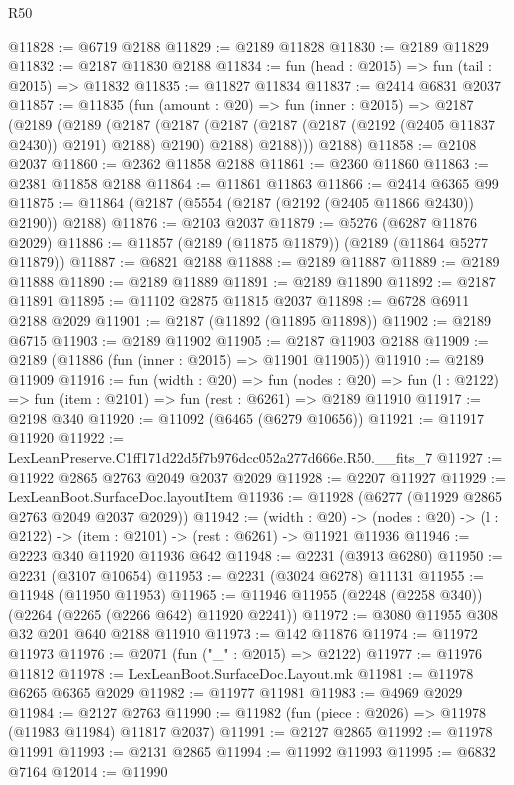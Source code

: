 \begin{lexlean}{R50}
\begin{coremodule}
@11828 := @6719 @2188
@11829 := @2189 @11828
@11830 := @2189 @11829
@11832 := @2187 @11830 @2188
@11834 := fun (head : @2015) => fun (tail : @2015) => @11832
@11835 := @11827 @11834
@11837 := @2414 @6831 @2037
@11857 := @11835
    (fun (amount : @20) =>
    fun (inner : @2015) =>
    @2187
      (@2189
        (@2189
          (@2187
            (@2187 (@2187 (@2187 (@2187 (@2192 (@2405 @11837 @2430)) @2191) @2188) @2190) @2188)
            @2188)))
      @2188)
@11858 := @2108 @2037
@11860 := @2362 @11858 @2188
@11861 := @2360 @11860
@11863 := @2381 @11858 @2188
@11864 := @11861 @11863
@11866 := @2414 @6365 @99
@11875 := @11864 (@2187 (@5554 (@2187 (@2192 (@2405 @11866 @2430)) @2190)) @2188)
@11876 := @2103 @2037
@11879 := @5276 (@6287 @11876 @2029)
@11886 := @11857 (@2189 (@11875 @11879)) (@2189 (@11864 @5277 @11879))
@11887 := @6821 @2188
@11888 := @2189 @11887
@11889 := @2189 @11888
@11890 := @2189 @11889
@11891 := @2189 @11890
@11892 := @2187 @11891
@11895 := @11102 @2875 @11815 @2037
@11898 := @6728 @6911 @2188 @2029
@11901 := @2187 (@11892 (@11895 @11898))
@11902 := @2189 @6715
@11903 := @2189 @11902
@11905 := @2187 @11903 @2188
@11909 := @2189 (@11886 (fun (inner : @2015) => @11901 @11905))
@11910 := @2189 @11909
@11916 := fun (width : @20) =>
  fun (nodes : @20) => fun (l : @2122) => fun (item : @2101) => fun (rest : @6261) => @2189 @11910
@11917 := @2198 @340
@11920 := @11092 (@6465 (@6279 @10656))
@11921 := @11917 @11920
@11922 := LexLeanPreserve.C1ff171d22d5f7b976dcc052a277d666e.R50.__fits_7
@11927 := @11922 @2865 @2763 @2049 @2037 @2029
@11928 := @2207 @11927
@11929 := LexLeanBoot.SurfaceDoc.layoutItem
@11936 := @11928 (@6277 (@11929 @2865 @2763 @2049 @2037 @2029))
@11942 := (width : @20) ->
  (nodes : @20) -> (l : @2122) -> (item : @2101) -> (rest : @6261) -> @11921 @11936
@11946 := @2223 @340 @11920 @11936 @642
@11948 := @2231 (@3913 @6280)
@11950 := @2231 (@3107 @10654)
@11953 := @2231 (@3024 @6278) @11131
@11955 := @11948 (@11950 @11953)
@11965 := @11946 @11955 (@2248 (@2258 @340)) (@2264 (@2265 (@2266 @642) @11920 @2241))
@11972 := @3080 @11955 @308 @32 @201 @640 @2188 @11910
@11973 := @142 @11876
@11974 := @11972 @11973
@11976 := @2071 (fun ("_" : @2015) => @2122)
@11977 := @11976 @11812
@11978 := LexLeanBoot.SurfaceDoc.Layout.mk
@11981 := @11978 @6265 @6365 @2029
@11982 := @11977 @11981
@11983 := @4969 @2029
@11984 := @2127 @2763
@11990 := @11982 (fun (piece : @2026) => @11978 (@11983 @11984) @11817 @2037)
@11991 := @2127 @2865
@11992 := @11978 @11991
@11993 := @2131 @2865
@11994 := @11992 @11993
@11995 := @6832 @7164
@12014 := @11990

\end{coremodule}
\end{lexlean}
